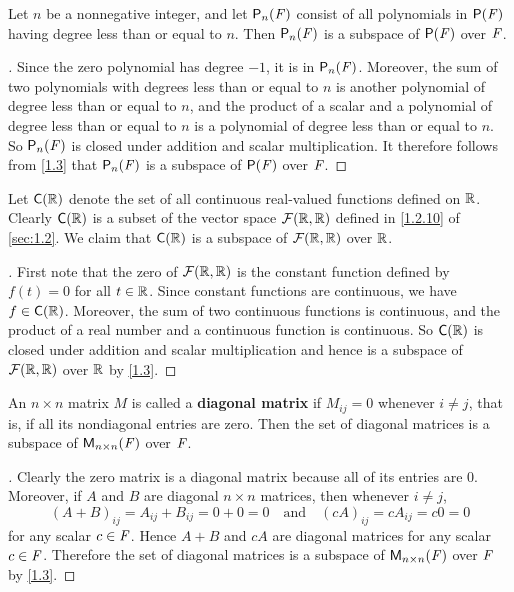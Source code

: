 \begin{eg}\label{1.3.6}
	Let \(n\) be a nonnegative integer, and let \(\ps[n]{\F}\) consist of all polynomials in \(\ps{\F}\) having degree less than or equal to \(n\).
	Then \(\ps[n]{\F}\) is a subspace of \(\ps{\F}\) over \(\mathit{F}\).
\end{eg}

\begin{proof}[]
	Since the zero polynomial has degree \(-1\), it is in \(\ps[n]{\F}\).
	Moreover, the sum of two polynomials with degrees less than or equal to \(n\) is another polynomial of degree less than or equal to \(n\), and the product of a scalar and a polynomial of degree less than or equal to \(n\) is a polynomial of degree less than or equal to \(n\).
	So \(\ps[n]{\F}\) is closed under addition and scalar multiplication.
	It therefore follows from \cref{1.3} that \(\ps[n]{\F}\) is a subspace of \(\ps{\F}\) over \(\mathit{F}\).
\end{proof}

\begin{eg}\label{1.3.7}
	Let \(\cfs(\R)\) denote the set of all continuous real-valued functions defined on \(\mathbb{R}\).
	Clearly \(\cfs(\R)\) is a subset of the vector space \(\mathcal{F}(\mathbb{R}, \mathbb{R})\) defined in \cref{1.2.10} of \cref{sec:1.2}.
	We claim that \(\cfs(\R)\) is a subspace of \(\mathcal{F}(\mathbb{R}, \mathbb{R})\) over \(\mathbb{R}\).
\end{eg}

\begin{proof}[]
	First note that the zero of \(\mathcal{F}(\mathbb{R}, \mathbb{R})\) is the constant function defined by \(f(t) = 0\) for all \(t \in \mathbb{R}\).
	Since constant functions are continuous, we have \(f \in \cfs(\R)\).
	Moreover, the sum of two continuous functions is continuous, and the product of a real number and a continuous function is continuous.
	So \(\cfs(\R)\) is closed under addition and scalar multiplication and hence is a subspace of \(\mathcal{F}(\mathbb{R}, \mathbb{R})\) over \(\mathbb{R}\) by \cref{1.3}.
\end{proof}

\begin{eg}\label{1.3.8}
	An \(n \times n\) matrix \(M\) is called a \textbf{diagonal matrix} if \(M_{i j} = 0\) whenever \(i \neq j\), that is, if all its nondiagonal entries are zero.
	Then the set of diagonal matrices is a subspace of \(\ms[n][n][\F]\) over \(\mathit{F}\).
\end{eg}

\begin{proof}[]
	Clearly the zero matrix is a diagonal matrix because all of its entries are \(0\).
	Moreover, if \(A\) and \(B\) are diagonal \(n \times n\) matrices, then whenever \(i \neq j\),
	\[
		(A + B)_{i j} = A_{i j} + B_{i j} = 0 + 0 = 0 \quad \text{and} \quad (cA)_{i j} = cA_{i j} = c0 = 0
	\]
	for any scalar \(c \in \mathit{F}\).
	Hence \(A + B\) and \(cA\) are diagonal matrices for any scalar \(c \in \mathit{F}\).
	Therefore the set of diagonal matrices is a subspace of \(\ms[n][n][\F]\) over \(\mathit{F}\) by \cref{1.3}.
\end{proof}

